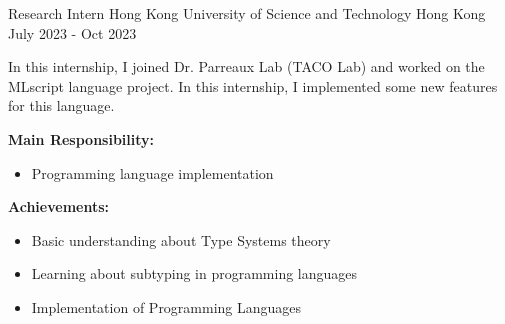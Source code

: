 

\begin{cventries}
  \cventry
  {Research Intern} %
  {Hong Kong University of Science and Technology} %
  {Hong Kong} %
  {July 2023 - Oct 2023} %
  {
    \begin{cvitems} %
      \item {In this internship, I joined Dr. Parreaux Lab (TACO Lab) and worked on the MLscript language project. In this internship, I implemented some new features for this language.}
      \item {\textbf{Main Responsibility:}
            \begin{itemize}[label=-]
           \item Programming language implementation
            \end{itemize}
            }
      \item {\textbf{Achievements:}
            \begin{itemize}[label=-]
                \item Basic understanding about Type Systems theory
                \item  Learning about subtyping in programming languages
                \item Implementation of Programming Languages
            \end{itemize}
            }
    \end{cvitems}
  }


\end{cventries}
